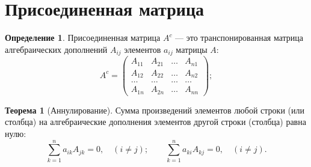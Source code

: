 \documentclass[a5paper, 11pt]{extbook}
\theoremstyle{definition}
\newtheorem{theorem}{Теорема}[chapter]
\theoremstyle{definition}
\newtheorem{definition}{Определение}[chapter]
\begin{document}
\section{Присоединенная матрица}
\label{sec:org9f4f382}
\begin{definition}
    Присоединенная матрица \(A^c\) — это транспонированная матрица алгебраических дополнений \(A_{ij}\) элементов \(a_{ij}\) матрицы \(A\):
    \begin{equation*}
        A^c =
        \begin{pmatrix}
            A_{11} & A_{21} & \ldots & A_{n1} \\
            A_{12} & A_{22} & \ldots & A_{n2} \\
            \ldots & \ldots & \ldots & \ldots \\
            A_{1n} & A_{2n} & \ldots & A_{nn}
        \end{pmatrix};
    \end{equation*}
\end{definition}

\begin{theorem}[Аннулирование]
    Сумма произведений  элементов любой строки (или столбца) на алгебраические дополнения элементов другой строки (столбца) равна нулю:
    \begin{equation*}
        \sum_{k = 1}^n a_{ik} A_{jk} = 0, \quad (i \neq j);
        \qquad
        \sum_{k = 1}^n a_{ki} A_{kj} = 0, \quad (i \neq j).
    \end{equation*}
    \label{det-cancellation}
\end{theorem}
\end{document}
